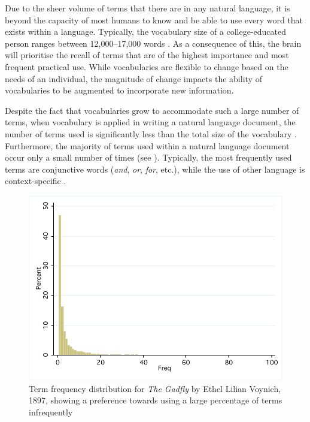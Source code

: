Due to the sheer volume of terms that there are in any natural language, it is beyond the capacity of most humans to know and be able to use every word that exists  within a language. Typically, the vocabulary size of a college-educated person ranges between 12,000--17,000 words \cite{Zechmeister95a}. As a consequence of this, the brain will prioritise the recall of terms that are of the highest importance and most frequent practical use. While vocabularies are flexible to change based on the needs of an individual, the magnitude of change impacts the ability of vocabularies to be augmented to incorporate new information.

Despite the fact that vocabularies grow to accommodate such a large number of terms, when vocabulary is applied in writing a natural language document, the number of terms used is significantly less than the total size of the vocabulary \cite{Biber98a}. Furthermore, the majority of terms used within a natural language document occur only a small number of times (see ). Typically, the most frequently used terms are conjunctive words (\eg \emph{and}, \emph{or}, \emph{for}, etc.), while the use of other language is context-specific \cite{McEnery01a}.

\begin{figure}[t]
\centering
\includegraphics[width=\textwidth]{Figures/Vocab-GadflyFreqDist.pdf}
\caption{Term frequency distribution for \emph{The Gadfly} by Ethel Lilian Voynich, 1897, showing a preference towards using a large percentage of terms infrequently}
\label{fig:vocab_freqdist_gadfly}
\end{figure}

